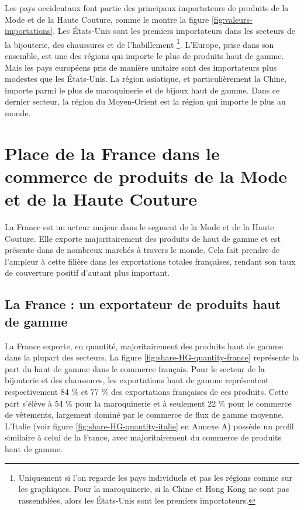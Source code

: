 \documentclass[french,10pt,a4paper]{article}
\begin{document}
Les pays occidentaux font partie des principaux importateurs de produits de la Mode et de la Haute Couture, comme le montre la figure \ref{fig:valeurs-importations}. Les États-Unis sont les premiers importateurs dans les secteurs de la bijouterie, des chaussures et de l'habillement \footnote{Uniquement si l'on regarde les pays individuels et pas les régions comme sur les graphiques. Pour la maroquinerie, si la Chine et Hong Kong ne sont pas rassemblées, alors les États-Unis sont les premiers importateurs.}. L'Europe, prise dans son ensemble, est une des régions qui importe le plus de produits haut de gamme. Mais les pays européens pris de manière unitaire sont des importateurs plus modestes que les États-Unis. La région asiatique, et particulièrement la Chine, importe parmi le plus de maroquinerie et de bijoux haut de gamme. Dans ce dernier secteur, la région du Moyen-Orient est la région qui importe le plus au monde.


\newpage

\section{Place de la France dans le commerce de produits de la Mode et de la Haute Couture}

La France est un acteur majeur dans le segment de la Mode et de la Haute Couture. Elle exporte majoritairement des produits de haut de gamme et est présente dans de nombreux marchés à travers le monde. Cela fait prendre de l'ampleur à cette filière dans les exportations totales françaises, rendant son taux de couverture positif d'autant plus important.


\subsection{La France : un exportateur de produits haut de gamme}

La France exporte, en quantité, majoritairement des produits haut de gamme dans la plupart des secteurs. La figure \ref{fig:share-HG-quantity-france} représente la part du haut de gamme dans le commerce français. Pour le secteur de la bijouterie et des chaussures, les exportations haut de gamme représentent respectivement 84 \% et 77 \% des exportations françaises de ces produits. Cette part s'élève à 54 \% pour la maroquinerie et à seulement 22 \% pour le commerce de vêtements, largement dominé par le commerce de flux de gamme moyenne. L'Italie (voir figure \ref{fig:share-HG-quantity-italie} en Annexe A) possède un profil similaire à celui de la France, avec majoritairement du commerce de produits haut de gamme.
\end{document}
